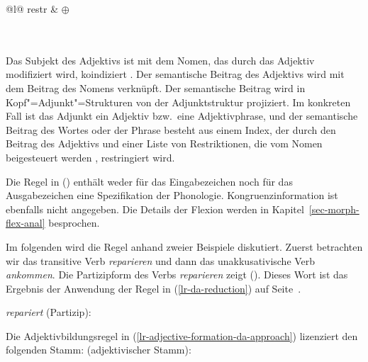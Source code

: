 {\begin{tabular}[t]{@{}l@{}}
{{{               restr &  $\oplus$   \\
             }\\
}\\}
\end{tabular}
\zs
%
Das Subjekt des Adjektivs ist mit dem Nomen, das durch das Adjektiv modifiziert wird, koindiziert .
Der semantische Beitrag des Adjektivs  wird mit dem Beitrag des Nomens  verknüpft. 
Der semantische Beitrag wird in Kopf"=Adjunkt"=Strukturen von der Adjunktstruktur projiziert.
Im konkreten Fall ist das Adjunkt ein Adjektiv bzw.\ eine Adjektivphrase, und der
semantische Beitrag des Wortes oder der Phrase besteht aus einem Index, der durch den Beitrag
des Adjektivs  und einer Liste von Restriktionen, die vom Nomen beigesteuert werden , restringiert wird.

Die Regel in () enthält weder für das Eingabezeichen noch für das Ausgabezeichen eine Spezifikation der Phonologie.
Kongruenzinformation ist ebenfalls nicht angegeben. Die Details der Flexion werden in Kapitel~\ref{sec-morph-flex-anal}
besprochen.

Im folgenden wird die Regel anhand zweier Beispiele diskutiert. Zuerst betrachten wir
das transitive Verb \emph{reparieren} und dann das unakkusativische Verb \emph{ankommen}.
Die Partizipform des Verbs \emph{reparieren} zeigt (). Dieses Wort ist
das Ergebnis der Anwendung der Regel in (\ref{lr-da-reduction}) auf Seite~\pageref{lr-da-reduction}.

\eas
\emph{repariert} (Partizip):\\
\zs

\noindent
Die Adjektivbildungsregel in (\ref{lr-adjective-formation-da-approach}) lizenziert
den folgenden Stamm:
\eas
{} (adjektivischer Stamm):\\
\zs

}
